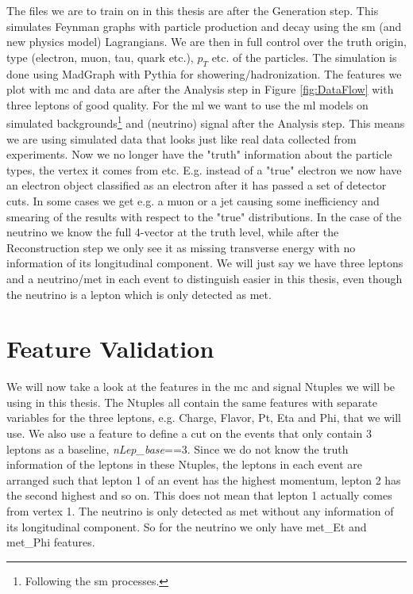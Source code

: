 \documentclass[a4paper, american, 12pt]{report}
\begin{document}
	The files we are to train on in this thesis are after the Generation step. This simulates Feynman graphs with particle production and decay using the \acrshort{sm} (and new physics model) Lagrangians. We are then in full control over the truth origin, type (electron, muon, tau, quark etc.), $p_T$ etc. of the particles. The simulation is done using MadGraph\cite{MadGraph} with Pythia\cite{pythia} for showering/hadronization. The features we plot with \acrshort{mc} and data are after the Analysis step in Figure \ref{fig:DataFlow} with three leptons of good quality. For the \acrshort{ml} we want to use the \acrshort{ml} models on simulated backgrounds\footnote{Following the \acrshort{sm} processes.} and (neutrino) signal after the Analysis step. This means we are using simulated data that looks just like real data collected from experiments. Now we no longer have the "truth" information about the particle types, the vertex it comes from etc. E.g. instead of a "true" electron we now have an electron object classified as an electron after it has passed a set of detector cuts. In some cases we get e.g. a muon or a jet causing some inefficiency and smearing of the results with respect to the "true" distributions. In the case of the neutrino we know the full 4-vector at the truth level, while after the Reconstruction step we only see it as missing transverse energy with no information of its longitudinal component. We will just say we have three leptons and a neutrino/\acrshort{met} in each event to distinguish easier in this thesis, even though the neutrino is a lepton which is only detected as \acrshort{met}.


	\section{Feature Validation}
	\label{sect:Method-Features}
	We will now take a look at the features in the \acrshort{mc} and signal Ntuples we will be using in this thesis. The Ntuples all contain the same features with separate variables for the three leptons, e.g. Charge, Flavor, Pt, Eta and Phi, that we will use. We also use a feature to define a cut on the events that only contain 3 leptons as a baseline, \textit{nLep\_base}==3. Since we do not know the truth information of the leptons in these Ntuples, the leptons in each event are arranged such that lepton 1 of an event has the highest momentum, lepton 2 has the second highest and so on. This does not mean that lepton 1 actually comes from vertex 1. The neutrino is only detected as \acrshort{met} without any information of its longitudinal component. So for the neutrino we only have met\_Et and met\_Phi features.
	
\end{document}
